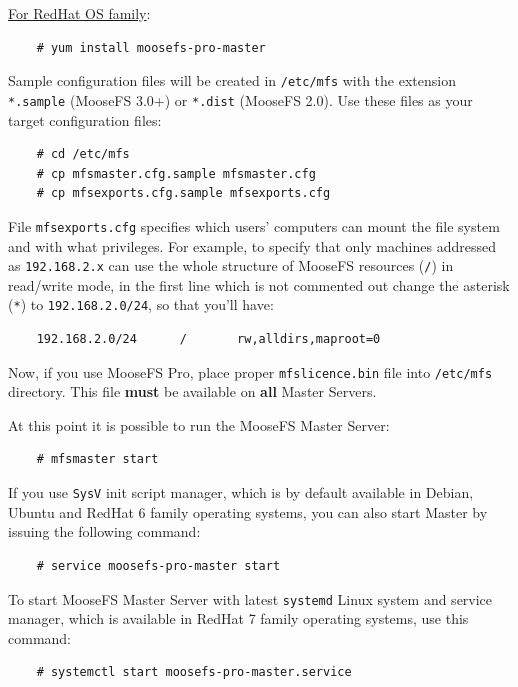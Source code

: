 \documentclass[a4paper,11pt,english]{report}
\def\code#1{\texttt{#1}}
\begin{document}
		
		\underline{For RedHat OS family}:
		\begin{lstlisting}
	# yum install moosefs-pro-master
		\end{lstlisting}
		
		Sample configuration files will be created in \code{/etc/mfs} with the extension \code{*.sample} (MooseFS 3.0+) or \code{*.dist} (MooseFS 2.0). Use these files as your target configuration files:
		
		\begin{lstlisting}
	# cd /etc/mfs
	# cp mfsmaster.cfg.sample mfsmaster.cfg
	# cp mfsexports.cfg.sample mfsexports.cfg
		\end{lstlisting}

		File \code{mfsexports.cfg} specifies which users' computers can mount the file system and with what privileges. For example, to specify that only machines addressed as \code{192.168.2.x} can use the whole structure of MooseFS resources (\code{/}) in read/write mode, in the first line which is not commented out change the asterisk (\code{*}) to \code{192.168.2.0/24}, so that you'll have:

		\begin{lstlisting}
	192.168.2.0/24		/		rw,alldirs,maproot=0
		\end{lstlisting}
		
		Now, if you use MooseFS Pro, place proper \code{mfslicence.bin} file into \code{/etc/mfs} directory. This file \textbf{must} be available on \textbf{all} Master Servers.
		
		At this point it is possible to run the MooseFS Master Server:
		\begin{lstlisting}
	# mfsmaster start
		\end{lstlisting}
		
		If you use \code{SysV} init script manager, which is by default available in Debian, Ubuntu and RedHat 6 family operating systems, you can also start Master by issuing the following command:

		\begin{lstlisting}
	# service moosefs-pro-master start
		\end{lstlisting}
		
		To start MooseFS Master Server with latest \code{systemd} Linux system and service manager, which is available in RedHat 7 family operating systems, use this command:

		\begin{lstlisting}
	# systemctl start moosefs-pro-master.service
		\end{lstlisting}
\end{document}
